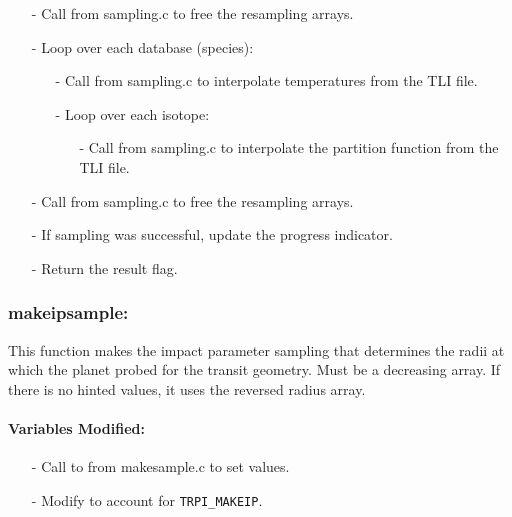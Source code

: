 \documentclass[letterpaper,12pt]{article}
\begin{document}
\begin{itemize}[leftmargin=10pt, noitemsep, parsep=0pt, topsep=0ex]
\item[-] Call  from sampling.c to free the resampling arrays.
\item[-] Loop over each database (species):
\begin{itemize}[leftmargin=10pt, noitemsep, parsep=0pt, topsep=0ex]
\item[-] Call  from sampling.c to interpolate temperatures from the TLI file.
\item[-] Loop over each isotope:
\begin{itemize}[leftmargin=10pt, noitemsep, parsep=0pt, topsep=0ex]
\item[-] Call  from sampling.c to interpolate the partition function from the TLI file.
\end{itemize}
\end{itemize}
\item[-] Call  from sampling.c to free the resampling arrays.
\item[-] If sampling was successful, update the progress indicator.
\item[-] Return the result flag.
\end{itemize}


\subsubsection{makeipsample:}
This function makes the impact parameter sampling that determines the
radii at which the planet probed for the transit geometry.  Must be a
decreasing array. If there is no hinted values, it uses the reversed
radius array.
\paragraph{Variables Modified:}
\begin{enumerate}[leftmargin=10pt, noitemsep, parsep=0pt, topsep=0ex]
\item[-] Call to  from makesample.c to set  values.
\item[-] Modify  to account for {\tt TRPI\_MAKEIP}.
\end{enumerate}
\end{document}

